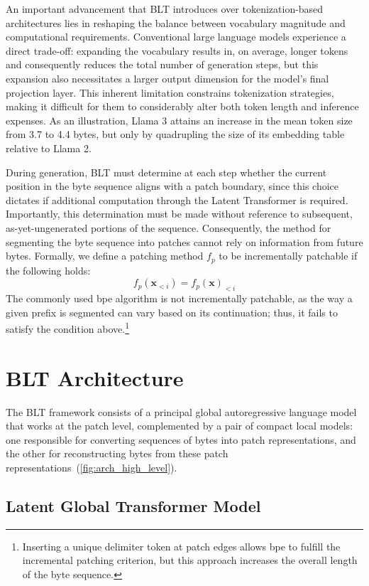 An important advancement that {\textsc BLT} introduces over tokenization-based architectures lies in reshaping the balance between vocabulary magnitude and computational requirements. Conventional large language models experience a direct trade-off: expanding the vocabulary results in, on average, longer tokens and consequently reduces the total number of generation steps, but this expansion also necessitates a larger output dimension for the model’s final projection layer. This inherent limitation constrains tokenization strategies, making it difficult for them to considerably alter both token length and inference expenses. As an illustration, Llama 3 attains an increase in the mean token size from 3.7 to 4.4 bytes, but only by quadrupling the size of its embedding table relative to Llama 2.

During generation, {\textsc BLT} must determine at each step whether the current position in the byte sequence aligns with a patch boundary, since this choice dictates if additional computation through the Latent Transformer is required. Importantly, this determination must be made without reference to subsequent, as-yet-ungenerated portions of the sequence. Consequently, the method for segmenting the byte sequence into patches cannot rely on information from future bytes. Formally, we define a patching method $f_p$ to be incrementally patchable if the following holds:
$$f_p(\pmb{x}_{<i}) = f_p(\pmb{x})_{<i}$$
The commonly used bpe algorithm is not incrementally patchable, as the way a given prefix is segmented can vary based on its continuation; thus, it fails to satisfy the condition above.\footnote{Inserting a unique delimiter token at patch edges allows bpe to fulfill the incremental patching criterion, but this approach increases the overall length of the byte sequence.}

\section{{\textsc BLT} Architecture}
\label{section:architecture}
The {\textsc BLT} framework consists of a principal global autoregressive language model that works at the patch level, complemented by a pair of compact local models: one responsible for converting sequences of bytes into patch representations, and the other for reconstructing bytes from these patch representations~(\autoref{fig:arch_high_level}).

\subsection{Latent Global Transformer Model}

